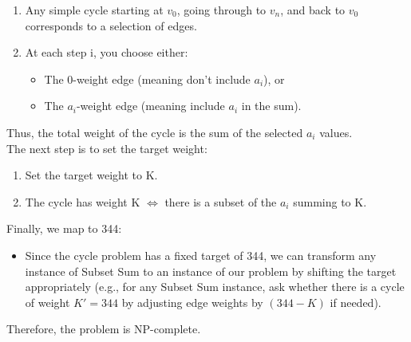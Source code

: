 \begin{enumerate} \item Any simple cycle starting at $v_0$, going through to $v_n$, and back to $v_0$ corresponds to a selection of edges. \item At each step i, you choose either: \begin{itemize} \item The 0-weight edge (meaning don't include $a_i$), or \item The $a_i$-weight edge (meaning include $a_i$ in the sum). \end{itemize} \end{enumerate}
Thus, the total weight of the cycle is the sum of the selected $a_i$ values.
\\ The next step is to set the target weight:
\begin{enumerate} \item Set the target weight to K. \item The cycle has weight K $\iff$ there is a subset of the $a_i$ summing to K. \end{enumerate}
Finally, we map to 344:
\begin{itemize} \item Since the cycle problem has a fixed target of 344, we can transform any instance of Subset Sum to an instance of our problem by shifting the target appropriately (e.g., for any Subset Sum instance, ask whether there is a cycle of weight $K' = 344$ by adjusting edge weights by $(344 - K)$ if needed). \end{itemize}
Therefore, the problem is NP-complete.